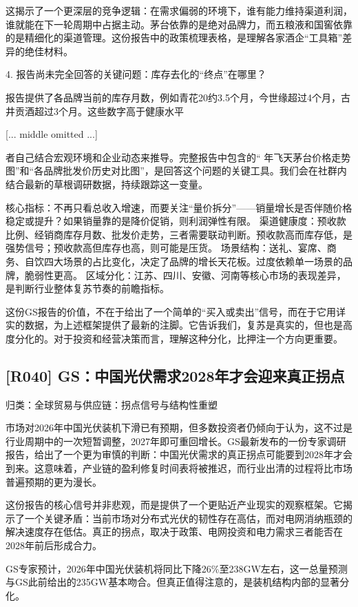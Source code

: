 \documentclass[11pt]{ctexart}
\begin{document}
这揭示了一个更深层的竞争逻辑：在需求偏弱的环境下，谁有能力维持渠道利润，谁就能在下一轮周期中占据主动。茅台依靠的是绝对品牌力，而五粮液和国窖依靠的是精细化的渠道管理。这份报告中的政策梳理表格，是理解各家酒企“工具箱”差异的绝佳材料。

4. 报告尚未完全回答的关键问题：库存去化的“终点”在哪里？

报告提供了各品牌当前的库存月数，例如青花20约3.5个月，今世缘超过4个月，古井贡酒超过3个月。这些数字高于健康水平

[... middle omitted ...]

者自己结合宏观环境和企业动态来推导。完整报告中包含的“ 年飞天茅台价格走势图”和“各品牌批发价历史对比图”，是回答这个问题的关键工具。我们会在社群内结合最新的草根调研数据，持续跟踪这一变量。

核心指标：不再只看总收入增速，而要关注“量价拆分”——销量增长是否伴随价格稳定或提升？如果销量靠的是降价促销，则利润弹性有限。 渠道健康度：预收款比例、经销商库存月数、批发价走势，三者需要联动判断。预收款高而库存低，是强势信号；预收款高但库存也高，则可能是压货。 场景结构：送礼、宴席、商务、自饮四大场景的占比变化，决定了品牌的增长天花板。过度依赖单一场景的品牌，脆弱性更高。 区域分化：江苏、四川、安徽、河南等核心市场的表现差异，是判断行业整体复苏节奏的前瞻指标。

这份GS报告的价值，不在于给出了一个简单的“买入或卖出”信号，而在于它用详实的数据，为上述框架提供了最新的注脚。它告诉我们，复苏是真实的，但也是高度分化的。对于投资和经营决策而言，理解这种分化，比押注一个方向更重要。

\subsection{[R040] GS：中国光伏需求2028年才会迎来真正拐点}
{\small\color{refgray}归类：全球贸易与供应链：拐点信号与结构性重塑}

市场对2026年中国光伏装机下滑已有预期，但多数投资者仍倾向于认为，这不过是行业周期中的一次短暂调整，2027年即可重回增长。GS最新发布的一份专家调研报告，给出了一个更为审慎的判断：中国光伏需求的真正拐点可能要到2028年才会到来。这意味着，产业链的盈利修复时间表将被推迟，而行业出清的过程将比市场普遍预期的更为漫长。

这份报告的核心信号并非悲观，而是提供了一个更贴近产业现实的观察框架。它揭示了一个关键矛盾：当前市场对分布式光伏的韧性存在高估，而对电网消纳瓶颈的解决速度存在低估。真正的拐点，取决于政策、电网投资和电力需求三者能否在2028年前后形成合力。

GS专家预计，2026年中国光伏装机将同比下降26\%至238GW左右，这一总量预测与GS此前给出的235GW基本吻合。但真正值得注意的，是装机结构内部的显著分化。
\end{document}
